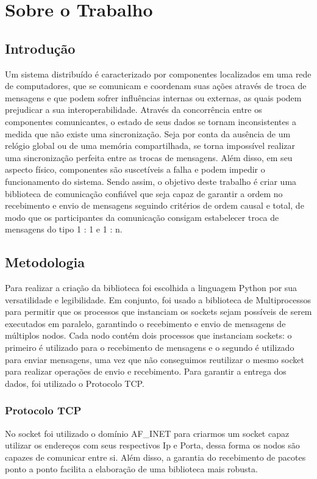 \documentclass[
	12pt,				%
	openright,			%
	oneside,			%
	a4paper,			%
	english,			%
	french,				%
	spanish,			%
	brazil				%
	]{abntex2}
\begin{document}
\chapter{Sobre o Trabalho}

\section{Introdução}
Um sistema distribuído é caracterizado por componentes localizados em uma rede de computadores,
que se comunicam e coordenam suas ações através de troca de mensagens e que podem sofrer
influências internas ou externas, as quais podem prejudicar a sua interoperabilidade. Através da
concorrência entre os componentes comunicantes, o estado de seus dados se tornam inconsistentes a medida que não existe uma sincronização.
Seja por conta da ausência de um relógio global ou de uma memória compartilhada, se torna impossível realizar uma sincronização perfeita
entre as trocas de mensagens. Além disso, em seu aspecto físico, componentes são suscetíveis a falha
e podem impedir o funcionamento do sistema. Sendo assim, o objetivo deste trabalho é criar uma
biblioteca de comunicação confiável que seja capaz de garantir a ordem no recebimento e envio
de mensagens seguindo critérios de ordem causal e total, de modo que os participantes
da comunicação consigam estabelecer troca de mensagens do tipo 1 : 1 e 1 : n. 

\section{Metodologia}
Para realizar a criação da biblioteca foi escolhida a linguagem Python por sua versatilidade
e legibilidade. Em conjunto, foi usado a biblioteca de Multiprocessos para permitir que os processos
que instanciam os sockets sejam possíveis de serem executados em paralelo,
garantindo o recebimento e envio de mensagens de múltiplos nodos.
Cada nodo contém dois processos que instanciam sockets: o primeiro é utilizado para o recebimento de mensagens
e o segundo é utilizado para enviar mensagens, uma vez que não conseguimos reutilizar o mesmo socket para realizar
operações de envio e recebimento. Para garantir a entrega dos dados, foi utilizado o Protocolo TCP.  


\subsection{Protocolo TCP}
No socket foi utilizado o domínio AF\_INET para criarmos um socket capaz utilizar os endereços com seus respectivos Ip e Porta,
dessa forma os nodos são capazes de comunicar entre si. Além disso,
a garantia do recebimento de pacotes ponto a ponto facilita a elaboração de uma biblioteca
mais robusta.
\end{document}
